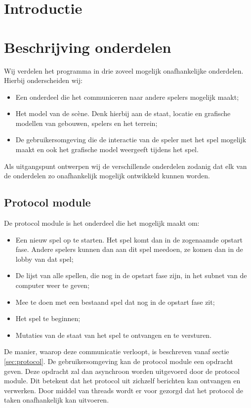 \documentclass[a4paper,11pt]{article}
\newcommand{\protoref}{sectie \ref{sec:protocol}}
\begin{document}
	
	
	\tableofcontents
	\newpage

	\section{Introductie}
	
	\newpage

    \section{Beschrijving onderdelen}
    Wij verdelen het programma in drie zoveel mogelijk onafhankelijke onderdelen. Hierbij onderscheiden wij:
    \begin{itemize}
    \item Een onderdeel die het communiceren naar andere spelers mogelijk maakt;
	\item Het model van de sc\`ene. Denk hierbij aan de staat, locatie en grafische modellen van gebouwen, spelers en het terrein;
	\item De gebruikersomgeving die de interactie van de speler met het spel mogelijk maakt en ook het grafische model weergeeft tijdens het spel.
    \end{itemize}

    Als uitgangspunt ontwerpen wij de verschillende onderdelen zodanig dat elk van de onderdelen zo onafhankelijk mogelijk ontwikkeld kunnen worden.
    	
    \subsection{Protocol module}
    De protocol module is het onderdeel die het mogelijk maakt om:
	\begin{itemize}
	\item Een nieuw spel op te starten. Het spel komt dan in de zogenaamde opstart fase. Andere spelers kunnen dan aan dit spel meedoen, ze komen dan in de lobby van dat spel;
	\item De lijst van alle spellen, die nog in de opstart fase zijn, in het subnet van de computer weer te geven;
	\item Mee te doen met een bestaand spel dat nog in de opstart fase zit;
	\item Het spel te beginnen;
	\item Mutaties van de staat van het spel te ontvangen en te versturen.
	\end{itemize}
	De manier, waarop deze communicatie verloopt, is beschreven vanaf \protoref. De gebruikersomgeving kan de protocol module een opdracht geven. Deze opdracht zal dan asynchroon worden uitgevoerd door de protocol module. Dit betekent dat het protocol uit zichzelf berichten kan ontvangen en verwerken. Door middel van threads wordt er voor gezorgd dat het protocol de taken onafhankelijk kan uitvoeren.
	
\end{document}
